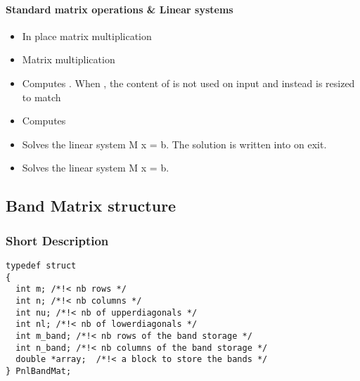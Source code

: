 \paragraph{Standard matrix operations \& Linear systems}
\begin{itemize}
  \item {}
    \sshortdescribe In place matrix multiplication  
  \item {}
    \sshortdescribe Matrix multiplication  
  \item {} 
    \sshortdescribe Computes . When , the
    content of  is not used on input and instead  is resized to
    match 
  \item {}
    \sshortdescribe Computes 
  \item {}
    \sshortdescribe Solves the linear system M x = b. The solution is written into
     on exit.
  \item {}
    \sshortdescribe Solves the linear system M x = b. 
\end{itemize}



\subsection{Band Matrix structure}
\subsubsection{Short Description}

\begin{verbatim}
typedef struct
{
  int m; /*!< nb rows */ 
  int n; /*!< nb columns */ 
  int nu; /*!< nb of upperdiagonals */
  int nl; /*!< nb of lowerdiagonals */
  int m_band; /*!< nb rows of the band storage */
  int n_band; /*!< nb columns of the band storage */
  double *array;  /*!< a block to store the bands */  
} PnlBandMat;
\end{verbatim}


